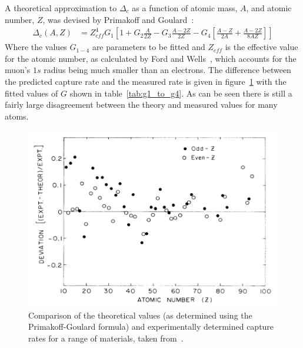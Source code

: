 A theoretical approximation to \( \Delta_c \) as a function of atomic mass, \( A \), and atomic number, \( Z \), was devised by Primakoff and Goulard~\cite{goulard_primakoff}:
\begin{align}
  \Delta_c(A,Z)&=Z^4_{eff} G_1 \left[ 1 + G_2 \frac{A}{2Z} - G_3 \frac{A-2Z}{2Z} - G_4 \left[\frac{A-Z}{2A} + \frac{A-2Z}{8AZ} \right] \right]
  \label{eq:primakoff_and_goulard}
\end{align}
Where the values \(G_{1-4}\) are parameters to be fitted and \( Z_{eff} \) is the effective value for the atomic number, as calculated by Ford and Wells~\cite{ford_and_wills_mesonic_atoms}, which accounts for the muon's \( 1s \) radius being much smaller than an electrons. The difference between the predicted capture rate and the measured rate is given in figure~\ref{fig:primakoff-goulard_vs_exp} with the fitted values of \(G\) shown in table~\ref{tab:g1_to_g4}. As can be seen there is still a fairly large disagreement between the theory and measured values for many atoms.

\begin{figure}[hptb]
  \centering
    \includegraphics[width=.9\textwidth]{images/primakoff-goulard_vs_exp.png}
  \caption{Comparison of the theoretical values (as determined using the Primakoff-Goulard formula) and experimentally determined capture rates for a range of materials, taken from~\cite{suzuki_mu_capture_rates}.}
  \label{fig:primakoff-goulard_vs_exp}
\end{figure}

